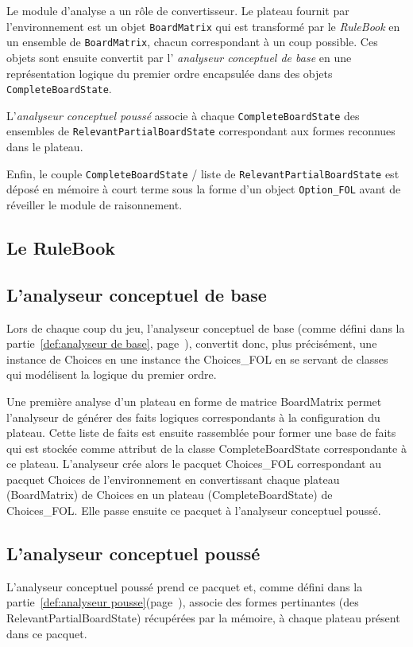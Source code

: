 Le module d'analyse a un rôle de convertisseur. Le plateau fournit par l'environnement est un objet \texttt{\gls{BoardMatrix}} qui est transformé par le \emph{RuleBook} en un ensemble de \texttt{\gls{BoardMatrix}}, chacun correspondant à un coup possible. Ces objets sont ensuite convertit par l' \emph{analyseur conceptuel de base} en une représentation logique du premier ordre encapsulée dans des objets \texttt{\gls{CompleteBoardState}}.

L'\emph{analyseur conceptuel poussé} associe à chaque \texttt{\gls{CompleteBoardState}} des ensembles de \texttt{\gls{RelevantPartialBoardState}} correspondant aux formes reconnues dans le plateau.

Enfin, le couple \texttt{\gls{CompleteBoardState}} / liste de \texttt{\gls{RelevantPartialBoardState}} est déposé en mémoire à court terme sous la forme d'un object \texttt{\gls{Option_FOL}} avant de réveiller le module de raisonnement.

\subsection{Le \og RuleBook \fg{}}

\subsection{L'analyseur conceptuel de base}
Lors de chaque coup du jeu, l'analyseur conceptuel de base (comme défini dans la partie~\ref{def:analyseur de base}, page~\pageref{def:analyseur de base}), convertit donc, plus précisément, une instance de Choices en une instance the Choices\_FOL en se servant de classes qui modélisent la logique du premier ordre. 

Une première analyse d'un plateau en forme de matrice BoardMatrix permet l'analyseur de générer des faits logiques correspondants à la configuration du plateau. Cette liste de faits est ensuite rassemblée pour former une base de faits qui est stockée comme attribut de la classe CompleteBoardState correspondante à ce plateau. L'analyseur crée alors le pacquet Choices\_FOL correspondant au pacquet Choices de l'environnement en convertissant chaque plateau (BoardMatrix) de Choices en un plateau (CompleteBoardState) de Choices\_FOL. Elle passe ensuite ce pacquet à l'analyseur conceptuel poussé. 
\subsection{L'analyseur conceptuel poussé}
L'analyseur conceptuel poussé prend ce pacquet et, comme défini dans la partie~\ref{def:analyseur pousse}(page~\pageref{def:analyseur pousse}), associe des formes pertinantes (des RelevantPartialBoardState) récupérées par la mémoire, à chaque plateau présent dans ce pacquet. 

